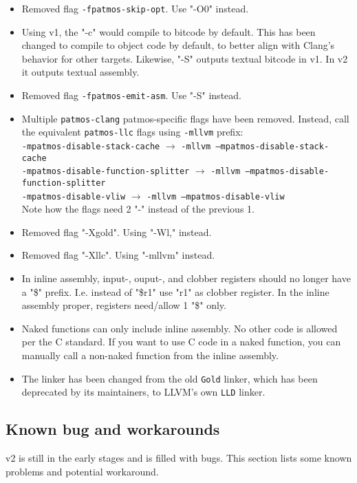 \begin{itemize}
	\item Removed flag \texttt{-fpatmos-skip-opt}. Use "-O0" instead.
	\item Using v1, the "-c" would compile to bitcode by default.
			This has been changed to compile to object code by default, to better align with Clang's behavior for other targets.
			Likewise, "-S" outputs textual bitcode in v1. In v2 it outputs textual assembly.
	\item Removed flag \texttt{-fpatmos-emit-asm}. Use "-S" instead.
	\item Multiple \texttt{patmos-clang} patmos-specific flags have been removed. 
		Instead, call the equivalent \texttt{patmos-llc} flags using \texttt{-mllvm} prefix:\\		
		\texttt{-mpatmos-disable-stack-cache} $\rightarrow$ \texttt{-mllvm --mpatmos-disable-stack-cache}\\
		\texttt{-mpatmos-disable-function-splitter} $\rightarrow$ \texttt{-mllvm --mpatmos-disable-function-splitter}\\
		\texttt{-mpatmos-disable-vliw} $\rightarrow$ \texttt{-mllvm --mpatmos-disable-vliw}\\
		Note how the flags need 2 "-" instead of the previous 1. 
	\item Removed flag "-Xgold". Using "-Wl," instead.
	\item Removed flag "-Xllc". Using "-mllvm" instead.
	\item In inline assembly, input-, ouput-, and clobber registers should no longer have a "\$" prefix.
		I.e. instead of "\$r1" use "r1" as clobber register.
		In the inline assembly proper, registers need/allow 1 "\$" only.
	\item Naked functions can only include inline assembly.
		No other code is allowed per the C standard.
		If you want to use C code in a naked function, you can manually call a non-naked function from the inline assembly.
	\item The linker has been changed from the old \texttt{Gold} linker, which has been deprecated by its maintainers, to LLVM's own \texttt{LLD} linker. 
	
\end{itemize}

\subsection{Known bug and workarounds}

v2 is still in the early stages and is filled with bugs.
This section lists some known problems and potential workaround.

